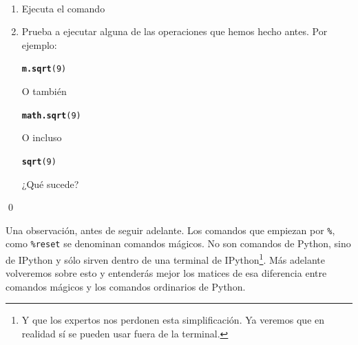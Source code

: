 \documentclass[10pt,a4paper]{article}\usepackage[]{graphicx}\usepackage[]{color}
\makeatletter
\newcommand{\hlnum}[1]{\textcolor[rgb]{0.686,0.059,0.569}{#1}}%
\newcommand{\hlstd}[1]{\textcolor[rgb]{0.345,0.345,0.345}{#1}}%
\newcommand{\hlkwd}[1]{\textcolor[rgb]{0.737,0.353,0.396}{\textbf{#1}}}%
\newenvironment{kframe}{%
 \def\at@end@of@kframe{}%
 \ifinner\ifhmode%
  \def\at@end@of@kframe{\end{minipage}}%
  \begin{minipage}{\columnwidth}%
 \fi\fi%
 \def\FrameCommand##1{\hskip\@totalleftmargin \hskip-\fboxsep
 \colorbox{shadecolor}{##1}\hskip-\fboxsep
     \hskip-\linewidth \hskip-\@totalleftmargin \hskip\columnwidth}%
 \MakeFramed {\advance\hsize-\width
   \@totalleftmargin\z@ \linewidth\hsize
   \@setminipage}}%
 {\par\unskip\endMakeFramed%
 \at@end@of@kframe}
\newenvironment{knitrout}{}{} %
\makeatother
\begin{document}
\begin{ejercicio}
\label{tut02:ejercicio06}
\quad\\
\begin{enumerate}
\item Ejecuta el comando
\begin{knitrout}
\color{fgcolor}\begin{kframe}
\begin{alltt}
\end{alltt}
\end{kframe}
\end{knitrout}
\item Prueba a ejecutar alguna de las operaciones que hemos hecho antes. Por ejemplo:
\begin{knitrout}
\color{fgcolor}\begin{kframe}
\begin{alltt}
\hlkwd{m.sqrt}\hlstd{(}\hlnum{9}\hlstd{)}
\end{alltt}
\end{kframe}
\end{knitrout}
O también
\begin{knitrout}
\color{fgcolor}\begin{kframe}
\begin{alltt}
\hlkwd{math.sqrt}\hlstd{(}\hlnum{9}\hlstd{)}
\end{alltt}
\end{kframe}
\end{knitrout}
O incluso
\begin{knitrout}
\color{fgcolor}\begin{kframe}
\begin{alltt}
\hlkwd{sqrt}\hlstd{(}\hlnum{9}\hlstd{)}
\end{alltt}
\end{kframe}
\end{knitrout}
¿Qué sucede?
\end{enumerate}
\qed
\end{ejercicio}

Una observación, antes de seguir adelante. Los comandos que empiezan por \verb#%#,
como \verb#%reset#
se denominan {\sf comandos mágicos}. No son comandos de Python, sino de IPython y sólo sirven dentro de una terminal de IPython\footnote{ Y que los expertos nos perdonen esta simplificación. Ya veremos que en realidad sí se pueden usar fuera de la terminal.}. Más adelante volveremos sobre esto y entenderás mejor los matices de esa diferencia entre comandos mágicos y los comandos ordinarios de Python.
\end{document}
